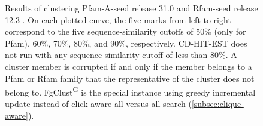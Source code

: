 \documentclass{bioinfo}
\begin{document}
\begin{figure}
	\caption{Results of clustering Pfam-A-seed release 31.0 \citep{finn2016pfam} and Rfam-seed release 12.3 \citep{nawrocki2014rfam}.
		On each plotted curve, the five marks from left to right correspond to the five sequence-similarity cutoffs of 50\% (only for Pfam), 60\%, 70\%, 80\%, and 90\%, respectively.
		CD-HIT-EST does not run with any sequence-similarity cutoff of less than 80\%.
		A cluster member is corrupted if and only if the member belongs to a Pfam or Rfam family that the representative of the cluster does not belong to.
		FgClust\textsuperscript{G} is the special instance using greedy incremental update instead of click-aware all-versus-all search (\cref{subsec:clique-aware}).
		\label{fig:pfam}
		\label{fig:rfam}
	}
\end{figure}
\end{document}
